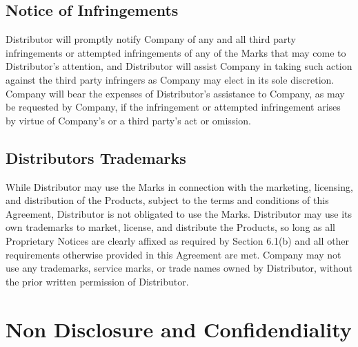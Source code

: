 \documentclass[letterpaper,10pt,openany,oneside,english]{sphinxmanual}
\begin{document}
\subsection{Notice of Infringements}
\label{\detokenize{trademarks:notice-of-infringements}}
Distributor will promptly notify Company of any and all third party infringements or attempted infringements of any of the Marks that may come to Distributor’s attention, and Distributor will assist Company in taking such action against the third party infringers as Company may elect in its sole discretion. Company will bear the expenses of Distributor’s assistance to Company, as may be requested by Company, if the infringement or attempted infringement arises by virtue of Company’s or a third party’s act or omission.


\subsection{Distributors Trademarks}
\label{\detokenize{trademarks:distributors-trademarks}}
While Distributor may use the Marks in connection with the marketing, licensing, and distribution of the Products, subject to the terms and conditions of this Agreement, Distributor is not obligated to use the Marks. Distributor may use its own trademarks to market, license, and distribute the Products, so long as all Proprietary Notices are clearly affixed as required by Section 6.1(b) and all other requirements otherwise provided in this Agreement are met. Company may not use any trademarks, service marks, or trade names owned by Distributor, without the prior written permission of Distributor.


\section{Non Disclosure and Confidendiality}
\label{\detokenize{nondisclosure:non-disclosure-and-confidendiality}}\label{\detokenize{nondisclosure::doc}}
\end{document}
